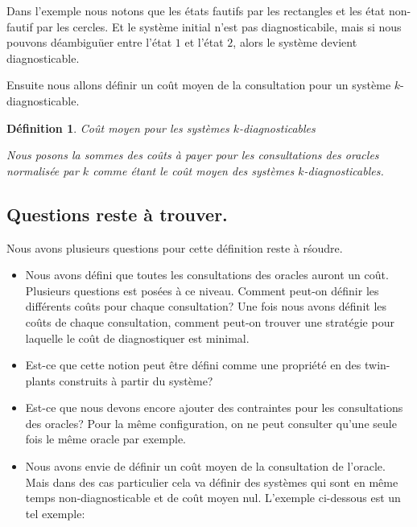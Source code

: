 \documentclass[a4paper,10pt]{article}
\newtheorem{mydef}{D\'efinition}
\begin{document}
Dans l'exemple nous notons que les \'etats fautifs par les rectangles et les \'etat non-fautif par les cercles. Et le syst\`eme initial n'est pas diagnosticabile, mais si nous pouvons d\'eambigu\"uer entre l'\'etat $1$ et l'\'etat $2$, alors le syst\`eme devient diagnosticable.

Ensuite nous allons d\'efinir un co\^ut moyen de la consultation pour un syst\`eme $k$-diagnosticable.

\begin{mydef}{Co\^ut moyen pour les syst\`emes $k$-diagnosticables}
  
  Nous posons la sommes des co\^uts \`a payer pour les consultations des oracles normalis\'ee par $k$ comme \'etant le co\^ut moyen des syst\`emes $k$-diagnosticables.
\end{mydef}

\subsection{Questions reste \`a trouver.}

Nous avons plusieurs questions pour cette d\'efinition reste \`a r\'soudre.

\begin{itemize}
\item Nous avons d\'efini que toutes les consultations des oracles auront un co\^ut. Plusieurs questions est pos\'ees \`a ce niveau. Comment peut-on d\'efinir les diff\'erents co\^uts pour chaque consultation? Une fois nous avons d\'efinit les co\^uts de chaque consultation, comment peut-on trouver une strat\'egie pour laquelle le co\^ut de diagnostiquer est minimal.

\item Est-ce que cette notion peut \^etre d\'efini comme une propri\'et\'e en des twin-plants construits \`a partir du syst\`eme?

\item Est-ce que nous devons encore ajouter des contraintes pour les consultations des oracles? Pour la m\^eme configuration, on ne peut consulter qu'une seule fois le m\^eme oracle par exemple.

\item Nous avons envie de d\'efinir un co\^ut moyen de la consultation de l'oracle. Mais dans des cas particulier cela va d\'efinir des syst\`emes qui sont en m\^eme temps non-diagnosticable et de co\^ut moyen nul. L'exemple ci-dessous est un tel exemple:

\begin{figure}[H]
  \begin{center}
  \end{center}
\end{figure}

  
\end{itemize}
\end{document}
